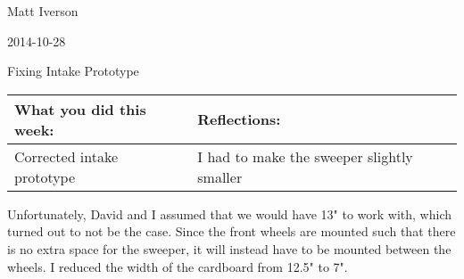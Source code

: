 Matt Iverson

2014-10-28

Fixing Intake Prototype

\begin{tabular}{|p{5cm}|p{5cm}|}
 \hline
 What you did this week: &
 Reflections: \\
 \hline
 Corrected intake prototype&
 I had to make the sweeper slightly smaller \\
 \hline
\end{tabular}

Unfortunately, David and I assumed that we would have 13" to work with, which turned out to not be the case. Since the front wheels are mounted such that there is no extra space for the sweeper, it will instead have to be mounted between the wheels. I reduced the width of the cardboard from 12.5" to 7".
